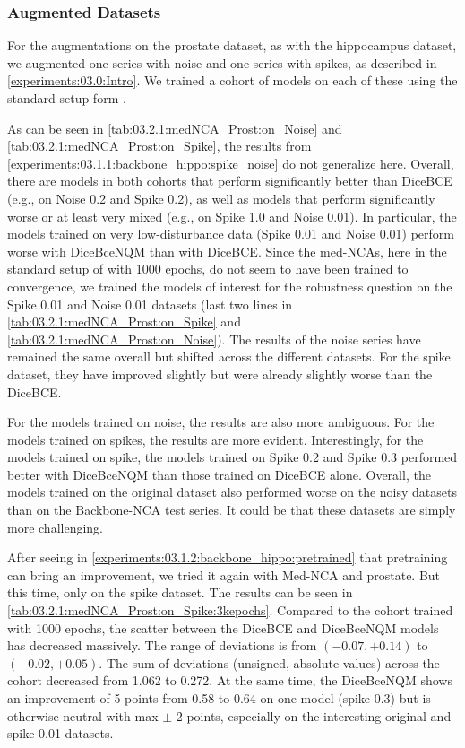\subsubsection{Augmented Datasets}
\label{experiments:03.2.1:med_prost:augmented}
For the augmentations on the prostate dataset, as with the hippocampus dataset, we augmented one series with noise and one series with spikes, as described in \autoref{experiments:03.0:Intro}. We trained a cohort of models on each of these using the standard setup form \cite{kalkhof:2023:medNCA}.

As can be seen in \ref{tab:03.2.1:medNCA_Prost:on_Noise} and \ref{tab:03.2.1:medNCA_Prost:on_Spike}, the results from \ref{experiments:03.1.1:backbone_hippo:spike_noise} do not generalize here. Overall, there are models in both cohorts that perform significantly better than DiceBCE (e.g., on Noise 0.2 and Spike 0.2), as well as models that perform significantly worse or at least very mixed (e.g., on Spike 1.0 and Noise 0.01). In particular, the models trained on very low-disturbance data (Spike 0.01 and Noise 0.01) perform worse with DiceBceNQM than with DiceBCE. 
Since the med-NCAs, here in the standard setup of \cite{kalkhof:2023:medNCA} with 1000 epochs, do not seem to have been trained to convergence, we trained the models of interest for the robustness question on the Spike 0.01 and Noise 0.01 datasets (last two lines in \autoref{tab:03.2.1:medNCA_Prost:on_Spike} and \autoref{tab:03.2.1:medNCA_Prost:on_Noise}). The results of the noise series have remained the same overall but shifted across the different datasets. For the spike dataset, they have improved slightly but were already slightly worse than the DiceBCE.

For the models trained on noise, the results are also more ambiguous. For the models trained on spikes, the results are more evident. Interestingly, for the models trained on spike, the models trained on Spike 0.2 and Spike 0.3 performed better with DiceBceNQM than those trained on DiceBCE alone. Overall, the models trained on the original dataset also performed worse on the noisy datasets than on the Backbone-NCA test series. It could be that these datasets are simply more challenging.

After seeing in \autoref{experiments:03.1.2:backbone_hippo:pretrained} that pretraining can bring an improvement, we tried it again with Med-NCA and prostate. But this time, only on the spike dataset. The results can be seen in \autoref{tab:03.2.1:medNCA_Prost:on_Spike:3kepochs}. Compared to the cohort trained with 1000 epochs, the scatter between the DiceBCE and DiceBceNQM models has decreased massively. The range of deviations is from $(-0.07, +0.14)$ to $(-0.02, +0.05)$. The sum of deviations (unsigned, absolute values) across the cohort decreased from 1.062 to 0.272.
At the same time, the DiceBceNQM shows an improvement of 5 points from 0.58 to 0.64 on one model (spike 0.3) but is otherwise neutral with max $\pm$ 2 points, especially on the interesting original and spike 0.01 datasets. 

